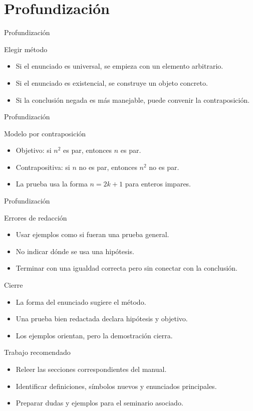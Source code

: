 \documentclass[aspectratio=169,11pt]{beamer}
\begin{document}
\section{Profundización}

\begin{frame}{Profundización}
\begin{block}{Elegir método}
\begin{itemize}
  \item Si el enunciado es universal, se empieza con un elemento arbitrario.
  \item Si el enunciado es existencial, se construye un objeto concreto.
  \item Si la conclusión negada es más manejable, puede convenir la contraposición.
\end{itemize}
\end{block}
\end{frame}

\begin{frame}{Profundización}
\begin{block}{Modelo por contraposición}
\begin{itemize}
  \item Objetivo: si \(n^2\) es par, entonces \(n\) es par.
  \item Contrapositiva: si \(n\) no es par, entonces \(n^2\) no es par.
  \item La prueba usa la forma \(n=2k+1\) para enteros impares.
\end{itemize}
\end{block}
\end{frame}

\begin{frame}{Profundización}
\begin{block}{Errores de redacción}
\begin{itemize}
  \item Usar ejemplos como si fueran una prueba general.
  \item No indicar dónde se usa una hipótesis.
  \item Terminar con una igualdad correcta pero sin conectar con la conclusión.
\end{itemize}
\end{block}
\end{frame}

\begin{frame}{Cierre}
\begin{itemize}
  \item La forma del enunciado sugiere el método.
  \item Una prueba bien redactada declara hipótesis y objetivo.
  \item Los ejemplos orientan, pero la demostración cierra.
\end{itemize}
\end{frame}

\begin{frame}{Trabajo recomendado}
\begin{itemize}
  \item Releer las secciones correspondientes del manual.
  \item Identificar definiciones, símbolos nuevos y enunciados principales.
  \item Preparar dudas y ejemplos para el seminario asociado.
\end{itemize}
\end{frame}
\end{document}
